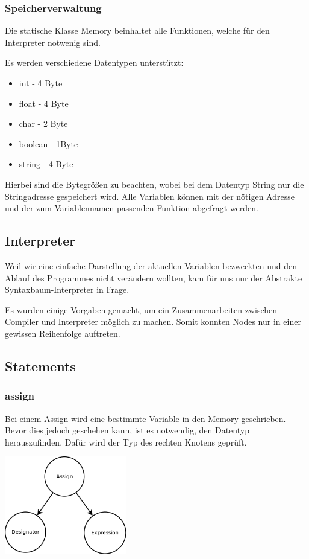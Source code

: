 \subsubsection{Speicherverwaltung}
Die statische Klasse Memory beinhaltet alle Funktionen, welche für den Interpreter notwenig sind.

Es werden verschiedene Datentypen unterstützt:
\begin{itemize}
 \item int - 4 Byte
 \item float - 4 Byte
 \item char - 2 Byte 
 \item boolean - 1Byte
 \item string - 4 Byte
\end{itemize}

Hierbei sind die Bytegrößen zu beachten, wobei bei dem Datentyp String nur die Stringadresse gespeichert wird. Alle Variablen können
mit der nötigen Adresse und der zum Variablennamen passenden Funktion abgefragt werden.

\subsection{Interpreter}
Weil wir eine einfache Darstellung der aktuellen Variablen bezweckten und den Ablauf des Programmes nicht verändern wollten, kam für 
uns nur der Abstrakte Syntaxbaum-Interpreter in Frage.

Es wurden einige Vorgaben gemacht, um ein Zusammenarbeiten zwischen Compiler und Interpreter möglich zu machen. Somit konnten Nodes
nur in einer gewissen Reihenfolge auftreten.
\subsection{Statements}
\subsubsection{assign}
Bei einem Assign wird eine bestimmte Variable in den Memory geschrieben. Bevor dies jedoch geschehen kann, ist es notwendig,
den Datentyp herauszufinden. Dafür wird der Typ des rechten Knotens geprüft.

\includegraphics[width=0.4\textwidth]{./media/images/interpreter/syntaxbaum/statements/assign.png}

